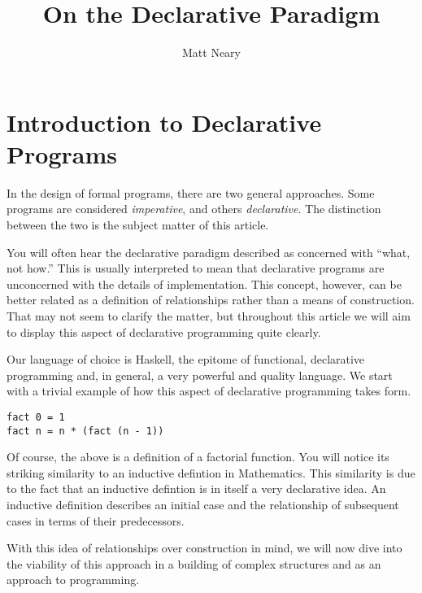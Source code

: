 \documentclass{article}
\begin{document}
\begin{titlepage}
\title{On the Declarative Paradigm}
\author{Matt Neary}
\maketitle
\begin{abstract}

\end{abstract}
\thispagestyle{empty}
\end{titlepage}

\section{Introduction to Declarative Programs}
In the design of formal programs, there are two general approaches. Some programs
are considered \emph{imperative}, and others \emph{declarative}. The distinction
between the two is the subject matter of this article. 

You will often hear the declarative paradigm described as concerned with
``what, not how.'' This is usually interpreted to mean that declarative programs
are unconcerned with the details of implementation. This concept, however, can
be better related as a definition of relationships rather than a means of
construction. That may not seem to clarify the matter, but throughout this
article we will aim to display this aspect of declarative programming quite
clearly.

Our language of choice is Haskell, the epitome of functional, declarative 
programming and, in general, a very powerful and quality language. We start with
a trivial example of how this aspect of declarative programming takes form.

\begin{verbatim}
fact 0 = 1
fact n = n * (fact (n - 1))
\end{verbatim}

Of course, the above is a definition of a factorial function. You will notice
its striking similarity to an inductive defintion in Mathematics. This similarity
is due to the fact that an inductive defintion is in itself a very declarative
idea. An inductive definition describes an initial case and the relationship of
subsequent cases in terms of their predecessors.

With this idea of relationships over construction in mind, we will now dive
into the viability of this approach in a building of complex structures and
as an approach to programming.
\end{document}
